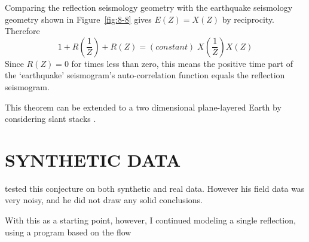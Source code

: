 
Comparing the reflection seismology geometry with the 
earthquake seismology geometry shown in Figure~\ref{fig:8-8} gives 
$E(Z) = X(Z)$ by reciprocity.  Therefore
\begin{equation}
1 + R\left(\frac{1}{Z}\right) + R(Z) = 
(constant) \; X\left(\frac{1}{Z}\right) X(Z)
\end{equation}
Since $R(Z)=0$ for times less than zero, this means the positive time part 
of the `earthquake' seismogram's auto-correlation function 
equals the reflection seismogram. 

This theorem can be extended to a two dimensional plane-layered Earth 
by considering slant stacks \cite[]{iei}.


\section{SYNTHETIC DATA}

\cite{scthesis} tested this conjecture on both synthetic 
and real data.  However his field data was very noisy, and he did not draw any 
solid conclusions.

With this as a starting point, however, I continued modeling a single 
reflection, using a program based on the flow \\


